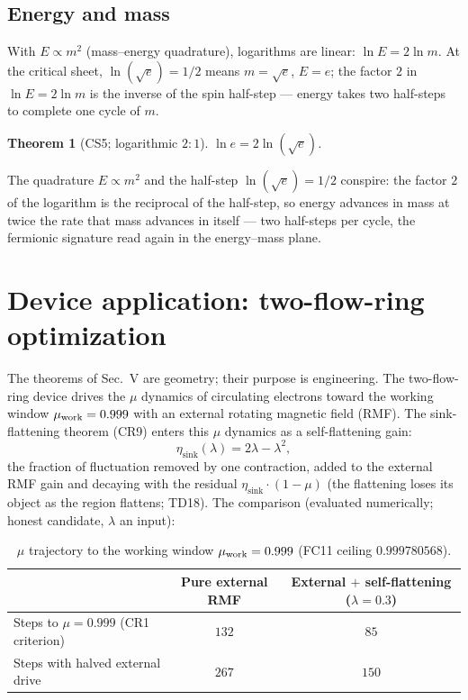 \documentclass[aps,prd,preprint,superscriptaddress,amsmath,amssymb]{revtex4-2}
\newtheorem{theorem}{Theorem}[section]
\begin{document}
\subsection{Energy and mass}

With $E\propto m^2$ (mass--energy quadrature), logarithms are
linear: $\ln E=2\ln m$.  At the critical sheet, $\ln(\sqrt e)=1/2$
means $m=\sqrt e$, $E=e$; the factor $2$ in $\ln E=2\ln m$ is the
inverse of the spin half-step --- energy takes two half-steps to
complete one cycle of $m$.

\begin{theorem}[CS5; logarithmic $2{:}1$]
\label{thm:cs5}
$\ln e=2\ln(\sqrt e)$.
\end{theorem}

The quadrature $E\propto m^2$ and the half-step $\ln(\sqrt e)=1/2$
conspire: the factor $2$ of the logarithm is the reciprocal of the
half-step, so energy advances in mass at twice the rate that mass
advances in itself --- two half-steps per cycle, the fermionic
signature read again in the energy--mass plane.

\section{Device application: two-flow-ring optimization}
\label{sec:device}

The theorems of Sec.~V are geometry; their purpose is engineering.  The
two-flow-ring device \cite{DesignTwoFlowRing} drives the $\mu$
dynamics of circulating electrons toward the working window
$\mu_{\rm work}=0.999$ with an external rotating magnetic field (RMF).
The sink-flattening theorem (CR9) enters this $\mu$ dynamics as a
self-flattening gain:
\begin{equation}
\label{eq:etasink}
\eta_{\text{sink}}(\lambda)=2\lambda-\lambda^2 ,
\end{equation}
the fraction of fluctuation removed by one contraction, added to the
external RMF gain and decaying with the residual
$\eta_{\text{sink}}\cdot(1-\mu)$ (the flattening loses its object as
the region flattens; TD18).  The comparison (evaluated numerically;
honest candidate, $\lambda$ an input):

\begin{table}[h]
\caption{$\mu$ trajectory to the working window $\mu_{\rm work}=0.999$
(FC11 ceiling $0.999780568$).}
\label{tab:sinkmu}
\begin{ruledtabular}
\begin{tabular}{lcc}
& Pure external RMF & External $+$ self-flattening ($\lambda=0.3$) \\
\hline
Steps to $\mu=0.999$ (CR1 criterion) & $132$ & $85$ \\
Steps with halved external drive & $267$ & $150$ \\
\end{tabular}
\end{ruledtabular}
\end{table}
\end{document}
